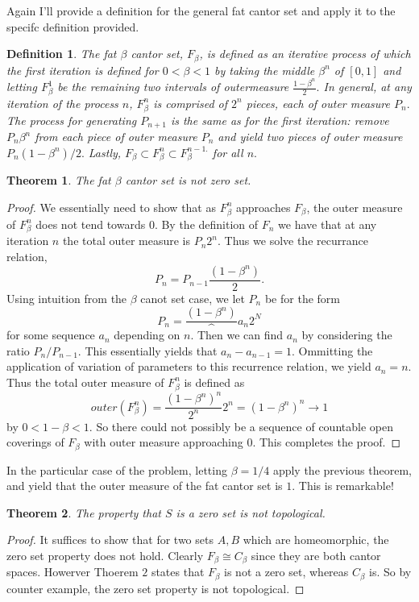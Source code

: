 \documentclass[letter]{article}
\newtheorem{theorem}{Theorem}
\newtheorem{definition}{Definition}
\newenvironment{menumerate}{%
  \edef\backupindent{\the\parindent}%
  \enumerate%
  \setlength{\parindent}{\backupindent}%
}{\endenumerate}
\begin{document}
\begin{menumerate}
	\item Again I'll provide a definition for the general fat cantor set and apply it to the specifc definition provided.
	\begin{definition}
		The fat $\beta$ cantor set, $F_\beta$, is defined as an iterative process of which the first iteration is defined for $0 < \beta < 1$ by taking the middle $\beta^n$ of $[0,1]$ and letting $F^1_\beta$ be the remaining two intervals of outermeasure $\frac{1-\beta^n}{2}.$ In general, at any iteration of the process $n$, $F^n_\beta$ is comprised of $2^n$ pieces, each of outer measure $P_n.$ The process for generating $P_{n+1}$ is the same as for the first iteration: remove $P_n\beta^n$ from each piece of outer measure $P_n$ and yield two pieces of outer measure $P_n(1-\beta^n)/2.$ Lastly, $F_\beta \subset F_\beta^n\subset F_\beta^{n-1.}$ for all $n.$
	\end{definition}

	\begin{theorem}
		The fat $\beta$ cantor set is not zero set.
	\end{theorem}
	\begin{proof}
	We essentially need to show that as $F_\beta^n$ approaches $F_\beta$, the outer measure of $F_\beta^n$ does not tend towards $0$. By the definition of $F_n$ we have that at any iteration $n$ the total outer measure is $P_n2^n.$ Thus we solve the recurrance relation, $$P_n = P_{n-1}\frac{(1-\beta^n)}{2}.$$ Using intuition from the $\beta$ canot set case, we let $P_n$ be for the form $$P_n = \frac{(1-\beta^n)}^a_n{2^N}$$ for some sequence $a_n$ depending on $n.$ Then we can find $a_n$ by considering the ratio $P_n/P_{n-1}.$ This essentially yields that $a_n - a_{n-1} = 1.$ Ommitting the application of variation of parameters to this recurrence relation, we yield $a_n = n.$ Thus the total outer measure of $F^n_\beta$ is defined as 
	$$outer(F^n_\beta) = \frac{(1-\beta^n)^n}{2^n}2^n = (1-\beta^n)^n \to 1$$
	by $0<1-\beta<1.$ So there could not possibly be a sequence of countable open coverings of $F_\beta$ with outer measure approaching $0.$ This completes the proof.
	\end{proof}

	In the particular case of the problem, letting $\beta = 1/4$ apply the previous theorem, and yield that the outer measure of the fat cantor set is $1.$ This is remarkable!

	\begin{theorem}
		The property that $S$ is a zero set is not topological.
	\end{theorem}
	\begin{proof}
		It suffices to show that for two sets $A,B$ which are homeomorphic, the zero set property does not hold. Clearly $F_\beta \cong C_\beta$ since they are both cantor spaces. Howerver Thoerem $2$ states that $F_\beta$ is not a zero set, whereas $C_\beta$ is. So by counter example, the zero set property is not topological.
	\end{proof}

\setcounter{enumi}{33}
\item

\end{menumerate}
\end{document}
